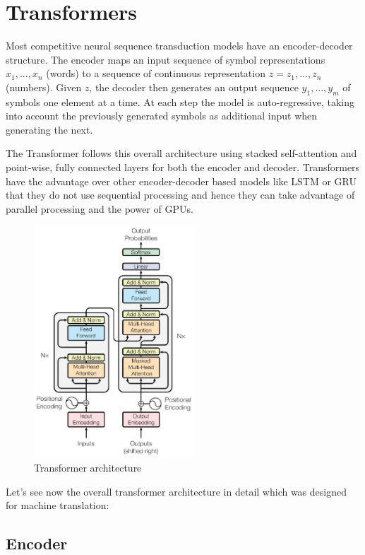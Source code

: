 \chapter{Transformers}

Most competitive neural sequence transduction models have an encoder-decoder structure. The encoder maps an input sequence of symbol representations $x_1, ..., x_n$ (words) to a sequence of continuous representation $ z = z_1, ..., z_n$ (numbers). Given $z$, the decoder then generates an output sequence $y_1, ..., y_m$ of symbols one element at a time. At each step the model is auto-regressive, taking into account the previously generated symbols as additional input when generating the next.

The Transformer follows this overall architecture using stacked self-attention and point-wise, fully connected layers for both the encoder and decoder. Transformers have the advantage over other encoder-decoder based models like LSTM or GRU that they do not use sequential processing and hence they can take advantage of parallel processing and the power of GPUs.

\begin{figure}[h]
    \centering
    \includegraphics[width=6cm]{Images/trasnformer.jpg}
    \caption{Transformer architecture}
    \label{fig:transformer}
\end{figure}

\noindent Let’s see now the overall transformer architecture in detail which was designed for machine translation:

\newpage
\section{Encoder}

